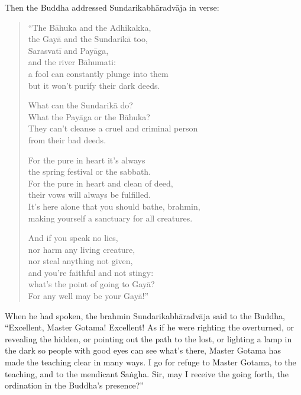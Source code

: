 \documentclass[12pt,openany]{book}%
\begin{document}
Then the Buddha addressed \textsanskrit{Sundarikabhāradvāja} in verse: 

\begin{verse}%
“The \textsanskrit{Bāhuka} and the Adhikakka, \\
the \textsanskrit{Gayā} and the \textsanskrit{Sundarikā} too, \\
\textsanskrit{Sarasvatī} and \textsanskrit{Payāga}, \\
and the river \textsanskrit{Bāhumati}: \\
a fool can constantly plunge into them \\
but it won’t purify their dark deeds. 

What can the \textsanskrit{Sundarikā} do? \\
What the \textsanskrit{Payāga} or the \textsanskrit{Bāhuka}? \\
They can’t cleanse a cruel and criminal person \\
from their bad deeds. 

For the pure in heart it’s always \\
the spring festival or the sabbath. \\
For the pure in heart and clean of deed, \\
their vows will always be fulfilled. \\
It’s here alone that you should bathe, brahmin, \\
making yourself a sanctuary for all creatures. 

And if you speak no lies, \\
nor harm any living creature, \\
nor steal anything not given, \\
and you’re faithful and not stingy: \\
what’s the point of going to \textsanskrit{Gayā}? \\
For any well may be your \textsanskrit{Gayā}!” 

%
\end{verse}

When he had spoken, the brahmin \textsanskrit{Sundarikabhāradvāja} said to the Buddha, “Excellent, Master Gotama! Excellent! As if he were righting the overturned, or revealing the hidden, or pointing out the path to the lost, or lighting a lamp in the dark so people with good eyes can see what’s there, Master Gotama has made the teaching clear in many ways. I go for refuge to Master Gotama, to the teaching, and to the mendicant \textsanskrit{Saṅgha}. Sir, may I receive the going forth, the ordination in the Buddha’s presence?” 
\end{document}

